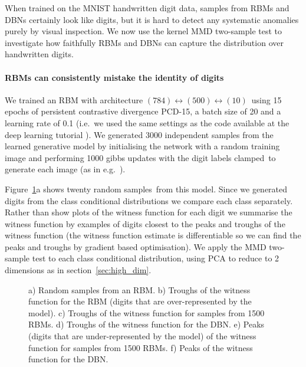\documentclass{article} %
\def\ie{i.e.\ }
\def\eg{e.g.\ }
\begin{document}
When trained on the MNIST handwritten digit data, samples from RBMs and DBNs certainly look like digits, but it is hard to detect any systematic anomalies purely by visual inspection.
We now use the kernel MMD two-sample test to investigate how faithfully RBMs and DBNs can capture the distribution over handwritten digits.

\paragraph{RBMs can consistently mistake the identity of digits}

We trained an RBM with architecture $(784)\leftrightarrow(500)\leftrightarrow(10)$\footnotemark~using 15 epochs of persistent contrastive divergence PCD-15, a batch size of 20 and a learning rate of 0.1 (\ie we used the same settings as the code available at the deep learning tutorial \citep{deep-learning-tutorial}).
We generated 3000 independent samples from the learned generative model by initialising the network with a random training image and performing 1000 gibbs updates with the digit labels clamped\footnotemark~to generate each image (as in \eg \cite{Hinton2007-eo}).

Figure~\ref{fig:digits}a shows twenty random samples\footnotemark~from this model.
Since we generated digits from the class conditional distributions we compare each class separately.
Rather than show plots of the witness function for each digit we summarise the witness function by examples of digits closest to the peaks and troughs of the witness function (the witness function estimate is differentiable so we can find the peaks and troughs by gradient based optimisation).
We apply the MMD two-sample test to each class conditional distribution, using PCA to reduce to 2 dimensions as in section~\ref{sec:high_dim}.

\begin{figure}[ht]
\centering

\caption{
a) Random samples from an RBM.
b) Troughs of the witness function for the RBM (digits that are over-represented by the model).
c) Troughs of the witness function for samples from 1500 RBMs.
d) Troughs of the witness function for the DBN.
e) Peaks (digits that are under-represented by the model) of the witness function for samples from 1500 RBMs.
f) Peaks of the witness function for the DBN.
}
\label{fig:digits}
\end{figure}
\end{document}
